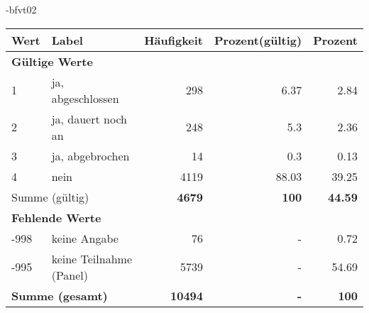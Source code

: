                 \vspace*{-\baselineskip}
					\begin{filecontents}{\jobname-bfvt02}
					\begin{longtable}{lXrrr}
					\toprule
					\textbf{Wert} & \textbf{Label} & \textbf{Häufigkeit} & \textbf{Prozent(gültig)} & \textbf{Prozent} \\
					\endhead
					\midrule
					\multicolumn{5}{l}{\textbf{Gültige Werte}}\\

					1 &
					\multicolumn{1}{X}{ ja, abgeschlossen   } &


					  \num{298} &
					  \num[round-mode=places,round-precision=2]{6.37} &
					    \num[round-mode=places,round-precision=2]{2.84} \\

					2 &
					\multicolumn{1}{X}{ ja, dauert noch an   } &


					  \num{248} &
					  \num[round-mode=places,round-precision=2]{5.3} &
					    \num[round-mode=places,round-precision=2]{2.36} \\

					3 &
					\multicolumn{1}{X}{ ja, abgebrochen   } &


					  \num{14} &
					  \num[round-mode=places,round-precision=2]{0.3} &
					    \num[round-mode=places,round-precision=2]{0.13} \\

					4 &
					\multicolumn{1}{X}{ nein   } &


					  \num{4119} &
					  \num[round-mode=places,round-precision=2]{88.03} &
					    \num[round-mode=places,round-precision=2]{39.25} \\
					\midrule
					\multicolumn{2}{l}{Summe (gültig)} &
					  \textbf{\num{4679}} &
					\textbf{\num{100}} &
					  \textbf{\num[round-mode=places,round-precision=2]{44.59}} \\
					\multicolumn{5}{l}{\textbf{Fehlende Werte}}\\
							-998 &
							keine Angabe &
							  \num{76} &
							 - &
							  \num[round-mode=places,round-precision=2]{0.72} \\
							-995 &
							keine Teilnahme (Panel) &
							  \num{5739} &
							 - &
							  \num[round-mode=places,round-precision=2]{54.69} \\
					\midrule
					\multicolumn{2}{l}{\textbf{Summe (gesamt)}} &
				      \textbf{\num{10494}} &
				    \textbf{-} &
				    \textbf{\num{100}} \\
					\bottomrule
					\end{longtable}
					\end{filecontents}
